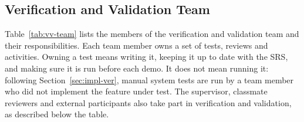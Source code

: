 \documentclass[12pt, titlepage]{article}
\newcounter{validation}
\begin{document}
\subsection{Verification and Validation Team}
\label{sec:team}

Table~\ref{tab:vv-team} lists the members of the verification and validation team and their responsibilities. Each team member owns a set of tests, reviews and activities. Owning a test means writing it, keeping it up to date with the SRS, and making sure it is run before each demo. It does not mean running it: following Section~\ref{sec:impl-ver}, manual system tests are run by a team member who did not implement the feature under test. The supervisor, classmate reviewers and external participants also take part in verification and validation, as described below the table.
\end{document}

